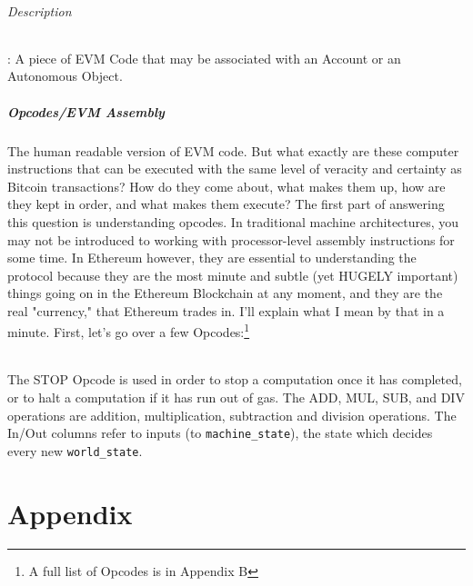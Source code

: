 \documentclass[10pt,a4paper,leqno,bibliography=totoc]{scrartcl}
\newenvironment{alphafootnotes}
{\par\edef\savedfootnotenumber{\number\value{footnote}}
\renewcommand{\thefootnote}{\alph{footnote}}
\setcounter{footnote}{0}}
{\par\setcounter{footnote}{\savedfootnotenumber}}
\begin{document}
\begin{alphafootnotes}
\begin{multicols*}{2}
				\paragraph{Description}: A piece of EVM Code that may be associated with an Account or an Autonomous Object. 

			\subsubsection{Opcodes/EVM Assembly}
		The human readable version of EVM code. But what exactly are these computer instructions that can be executed with the same level of veracity and certainty as Bitcoin transactions? How do they come about, what makes them up, how are they kept in order, and what makes them execute? The first part of answering this question is understanding opcodes. In traditional machine architectures, you may not be introduced to working with processor-level assembly instructions for some time. In Ethereum however, they are essential to understanding the protocol because they are the most minute and subtle (yet HUGELY important) things going on in the Ethereum Blockchain at any moment, and they are the real "currency," that Ethereum trades in. I'll explain what I mean by that in a minute. First, let's go over a few Opcodes:\footnote{A full list of Opcodes is in Appendix B} \\


				\paragraph{}The STOP Opcode is used in order to stop a computation once it has completed, or to halt a computation if it has run out of gas. The ADD, MUL, SUB, and DIV operations are addition, multiplication, subtraction and division operations. The In/Out columns refer to inputs (to \texttt{machine\_state}), the state which decides every new \texttt{world\_state}. 

\clearpage
\end{multicols*}
\part{Appendix}

\appendix


\end{alphafootnotes}
\end{document}
